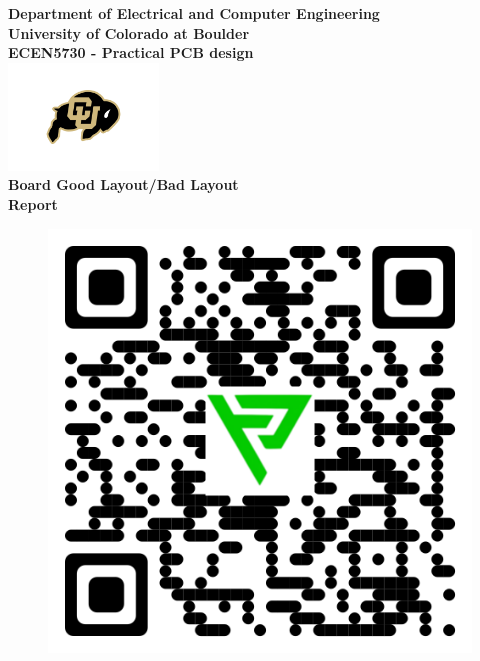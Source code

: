 \begin{titlepage}
\center %

\textbf{\large Department of Electrical and Computer Engineering}\\[0.5cm]
\textbf{\Large University of Colorado at Boulder}\\[1cm]
\textbf{\large ECEN5730 - Practical PCB design}\\[2cm]
\includegraphics[width=0.3\textwidth]{figures/cu}\\[2cm] 

	

\textbf{\Huge Board Good Layout/Bad Layout }\\[0.2cm]

\textbf{\Large Report}\\[2cm]
\vspace{1.5cm}
\begin{figure}[H]
	\centering
	\includegraphics[scale=0.2]{figures/qr_download.png}
	\label{555_schematic}
\end{figure}\vspace{1.5cm}



\end{titlepage}
